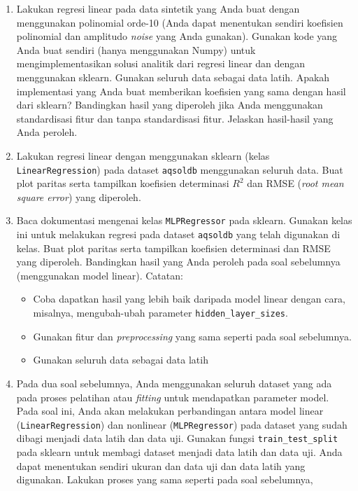 \documentclass[a4paper,11pt]{article} %
\newcommand{\pyinline}[1]{\texttt{#1}}
\begin{document}
\begin{enumerate}
%
%
\item Lakukan regresi linear pada data sintetik yang Anda buat dengan
menggunakan polinomial orde-10 (Anda dapat menentukan sendiri koefisien
polinomial dan amplitudo \textit{noise} yang Anda gunakan).
Gunakan kode yang Anda buat sendiri (hanya menggunakan Numpy)
untuk mengimplementasikan
solusi analitik dari regresi linear dan dengan menggunakan sklearn.
Gunakan seluruh data sebagai data latih.
Apakah implementasi yang Anda buat memberikan
koefisien yang sama dengan hasil dari sklearn? Bandingkan hasil yang diperoleh
jika Anda menggunakan standardisasi fitur dan tanpa standardisasi fitur. Jelaskan
hasil-hasil yang Anda peroleh.
%
%
\item Lakukan regresi linear dengan menggunakan sklearn (kelas
\pyinline{LinearRegression}) pada dataset
\texttt{aqsoldb} menggunakan seluruh data. Buat plot paritas serta tampilkan
koefisien determinasi $R^{2}$ dan RMSE (\textit{root mean square error})
yang diperoleh.
%
%
\item Baca dokumentasi mengenai kelas \texttt{MLPRegressor} pada sklearn.
Gunakan kelas ini untuk melakukan regresi pada dataset \texttt{aqsoldb}
yang telah digunakan di kelas.
Buat plot paritas serta tampilkan
koefisien determinasi dan RMSE yang diperoleh. Bandingkan hasil yang Anda peroleh pada soal
sebelumnya (menggunakan model linear).
Catatan:
  \begin{itemize}
  \item Coba dapatkan hasil yang lebih baik daripada model linear dengan
  cara, misalnya, mengubah-ubah parameter \pyinline{hidden_layer_sizes}.
  \item Gunakan fitur dan \textit{preprocessing} yang sama seperti pada
  soal sebelumnya.
  \item Gunakan seluruh data sebagai data latih
  \end{itemize}
%
%
\item Pada dua soal sebelumnya, Anda menggunakan seluruh dataset yang ada pada
proses pelatihan atau \textit{fitting} untuk mendapatkan parameter model.
Pada soal ini, Anda akan melakukan perbandingan antara model linear
(\pyinline{LinearRegression}) dan nonlinear (\pyinline{MLPRegressor}) pada
dataset yang sudah dibagi menjadi data latih dan data uji. Gunakan
fungsi \pyinline{train_test_split} pada sklearn untuk membagi dataset menjadi
data latih dan data uji. Anda dapat menentukan sendiri ukuran dan data uji dan
data latih yang digunakan. Lakukan proses yang sama seperti pada soal sebelumnya,

\end{enumerate}
\end{document}
